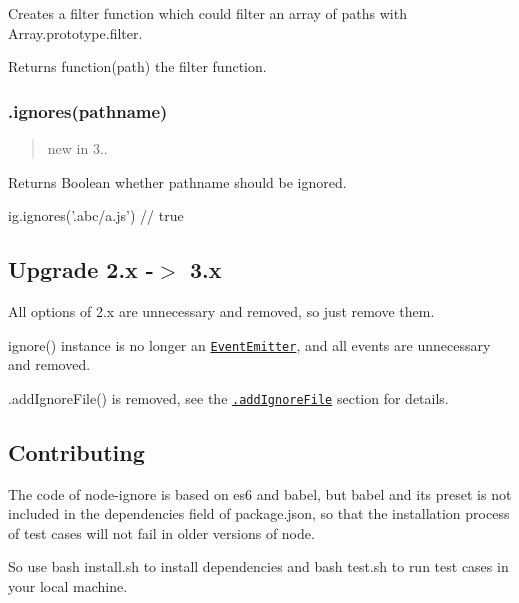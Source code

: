 Creates a filter function which could filter an array of paths with {\ttfamily Array.\+prototype.\+filter}.

Returns {\ttfamily function(path)} the filter function.

\subsubsection*{.ignores(pathname)}

\begin{quote}
new in 3.. \end{quote}


Returns {\ttfamily Boolean} whether {\ttfamily pathname} should be ignored.


\begin{DoxyCode}
ig.ignores('.abc/a.js')    // true
\end{DoxyCode}






\subsection*{Upgrade 2.\+x -\/$>$ 3.\+x}


\begin{DoxyItemize}
\item All {\ttfamily options} of 2.\+x are unnecessary and removed, so just remove them.
\item {\ttfamily ignore()} instance is no longer an \href{nodejs.org/api/events.html}{\tt {\ttfamily Event\+Emitter}}, and all events are unnecessary and removed.
\item {\ttfamily .add\+Ignore\+File()} is removed, see the \href{#addignorefilepath}{\tt .add\+Ignore\+File} section for details.
\end{DoxyItemize}





\subsection*{Contributing}

The code of {\ttfamily node-\/ignore} is based on es6 and babel, but babel and its preset is not included in the {\ttfamily dependencies} field of package.\+json, so that the installation process of test cases will not fail in older versions of node.

So use {\ttfamily bash install.\+sh} to install dependencies and {\ttfamily bash test.\+sh} to run test cases in your local machine.

